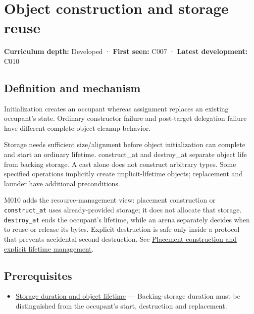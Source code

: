 \hypertarget{appendix-a82f9c438857}{}\label{referencestart:appendix-a82f9c438857}
\section{Object construction and storage reuse}\label{appendix-a82f9c438857-object-construction-and-storage-reuse}

\textbf{Curriculum depth:} Developed · \textbf{First seen:} C007 · \textbf{Latest development:} C010

\begin{allmightroledefinition}

\subsection{Definition and mechanism}\label{appendix-a82f9c438857-definition-and-mechanism}

Initialization creates an occupant whereas assignment replaces an existing occupant's state. Ordinary constructor failure and post-target delegation failure have different complete-object cleanup behavior.

\end{allmightroledefinition}

Storage needs sufficient size/alignment before object initialization can complete and start an ordinary lifetime. construct\_at and destroy\_at separate object life from backing storage. A cast alone does not construct arbitrary types. Some specified operations implicitly create implicit-lifetime objects; replacement and launder have additional preconditions.

M010 adds the resource-management view: placement construction or \texttt{construct\_at} uses already-provided storage; it does not allocate that storage. \texttt{destroy\_at} ends the occupant's lifetime, while an arena separately decides when to reuse or release its bytes. Explicit destruction is safe only inside a protocol that prevents accidental second destruction. See \hyperref[appendix-f56c3e43fd4e]{Placement construction and explicit lifetime management}.

\subsection{Prerequisites}\label{appendix-a82f9c438857-prerequisites}

\begin{itemize}
\tightlist
\item
  \hyperref[appendix-0b104bcba06b]{Storage duration and object lifetime} --- Backing-storage duration must be distinguished from the occupant's start, destruction and replacement.
\end{itemize}

